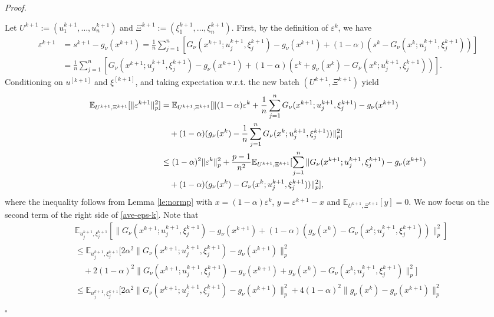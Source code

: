 \documentclass[11pt]{article}
\newenvironment{proof}[1][Proof]{%
    \par\noindent\textit{#1.}\enspace
  }{%
    \hfill\ensuremath{\square}\par
  }%
\numberwithin{equation}{section}
\newcommand{\E}{\mathbb{E}}
\begin{document}
\begin{proof}
Let $U^{k+1}:=(u_1^{k+1},\ldots,u_n^{k+1})$ and $\Xi^{k+1}:=(\xi_1^{k+1},\ldots,\xi_n^{k+1})$. 
    First, by the definition of $\varepsilon^k$, we have
    \begin{align*}
        \varepsilon^{k+1} &= s^{k+1} - g_\nu (x^{k+1})
             = \frac{1}{n}\sum_{j=1}^n [ G_\nu (x^{k+1};u_j^{k+1},\xi_j^{k+1}) - g_\nu (x^{k+1}) + (1-\alpha) (s^k - G_\nu (x^k;u_j^{k+1},\xi_j^{k+1}))]\\
            &= \frac{1}{n}\sum_{j=1}^n [ G_\nu (x^{k+1};u_j^{k+1},\xi_j^{k+1}) - g_\nu (x^{k+1})+ (1-\alpha) (\varepsilon^k +g_\nu (x^k) - G_\nu (x^k;u_j^{k+1},\xi_j^{k+1}))]. 
    \end{align*} 
    Conditioning on $u^{[k+1]}$ and $\xi^{[k+1]}$, and taking 
expectation w.r.t. the new batch
$(U^{k+1},\Xi^{k+1})$ yield
    \begin{align}
        \E_{U^{k+1},\Xi^{k+1}}[\|\varepsilon^{k+1}\|_p^2]
        &= \E_{U^{k+1},\Xi^{k+1}} [\|(1-\alpha) \varepsilon^k+\frac{1}{n}\sum_{j=1}^n G_\nu (x^{k+1};u_j^{k+1},\xi_j^{k+1}) - g_\nu (x^{k+1})\notag  \\
        &\quad + (1-\alpha) (g_\nu (x^k) - \frac{1}{n}\sum_{j=1}^n G_\nu (x^k;u_j^{k+1},\xi_j^{k+1}))\|_p^2]\notag  \\
        & \leq (1-\alpha)^2 \|\varepsilon^k\|_p^2+\frac{p -1}{n^2} \E_{U^{k+1},\Xi^{k+1}} [\sum_{j=1}^n\| G_\nu (x^{k+1};u_j^{k+1},\xi_j^{k+1}) - g_\nu (x^{k+1}) \notag \\
        &\quad+ (1-\alpha) (g_\nu (x^k) - G_\nu (x^k;u_j^{k+1},\xi_j^{k+1}))\|_p^2], \label{ave-eps-k}
    \end{align}
   where the inequality follows from Lemma \ref{le:normp} with $x=(1-\alpha)\varepsilon^k$, $y = \varepsilon^{k+1} -x$ and $\E_{U^{k+1},\Xi^{k+1}}[y]={0}$. We now focus on the second term of the right side of \eqref{ave-eps-k}. Note that 
    \begin{align*}
        &\E_{u_j^{k+1},\xi_j^{k+1}} [\|G_\nu (x^{k+1};u_j^{k+1},\xi_j^{k+1}) - g_\nu (x^{k+1}) + (1-\alpha) (g_\nu (x^k) - G_\nu (x^k;u_j^{k+1},\xi_j^{k+1}))\|_p^2]\\
        &\leq  \E_{u_j^{k+1},\xi_j^{k+1}} [2\alpha^2\|G_\nu (x^{k+1};u_j^{k+1},\xi_j^{k+1}) - g_\nu (x^{k+1})\|_p^2\\
        &\quad + 2(1-\alpha)^2\|G_\nu (x^{k+1};u_j^{k+1},\xi_j^{k+1}) - g_\nu (x^{k+1})+g_\nu (x^k) - G_\nu (x^k;u_j^{k+1},\xi_j^{k+1})\|_p^2]\\
        & \leq  \E_{u_j^{k+1},\xi_j^{k+1}} [2\alpha^2\|G_\nu (x^{k+1};u_j^{k+1},\xi_j^{k+1}) - g_\nu (x^{k+1})\|_p^2 + 4(1-\alpha)^2\|g_\nu (x^k) - g_\nu (x^{k+1}) \|_p^2\\

\end{align*}
\end{proof}
\end{document}
